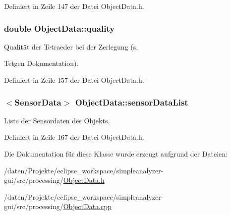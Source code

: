 Definiert in Zeile 147 der Datei Object\-Data.\-h.

\hypertarget{classObjectData_ae047918932000aca3ff1bc680b288c08}{
\subsubsection[{quality}]{\setlength{\rightskip}{0pt plus 5cm}double Object\-Data\-::quality\hspace{0.3cm}{\ttfamily [private]}}}\label{classObjectData_ae047918932000aca3ff1bc680b288c08}


Qualität der Tetraeder bei der Zerlegung (s. 

Tetgen Dokumentation). 

Definiert in Zeile 157 der Datei Object\-Data.\-h.

\hypertarget{classObjectData_af6a1dcb4e137b1698422a912c07c7f39}{
\subsubsection[{sensor\-Data\-List}]{$<${\bf Sensor\-Data}$>$ Object\-Data\-::sensor\-Data\-List\hspace{0.3cm}{\ttfamily [private]}}}\label{classObjectData_af6a1dcb4e137b1698422a912c07c7f39}


Liste der Sensordaten des Objekts. 



Definiert in Zeile 167 der Datei Object\-Data.\-h.



Die Dokumentation für diese Klasse wurde erzeugt aufgrund der Dateien\-:\begin{DoxyCompactItemize}
\item 
/daten/\-Projekte/eclipse\-\_\-workspace/simpleanalyzer-\/gui/src/processing/\hyperlink{ObjectData_8h}{Object\-Data.\-h}\item 
/daten/\-Projekte/eclipse\-\_\-workspace/simpleanalyzer-\/gui/src/processing/\hyperlink{ObjectData_8cpp}{Object\-Data.\-cpp}\end{DoxyCompactItemize}
